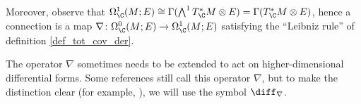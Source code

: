 Moreover, observe that \(\Omega_\C^1(M;E) \cong \Gamma(\bigwedge ^1T^*_\C M \otimes E)=\Gamma(T^*_\C M \otimes E)\), hence a connection is a map \(\nabla \colon \Omega_\C^0(M;E) \to \Omega_\C^1(M;E)\) satisfying the ``Leibniz rule'' of definition \ref{def_tot_cov_der}. 


The operator \(\nabla\) sometimes needs to be extended to act on higher-dimensional differential forms. Some references still call this operator \(\nabla\), but to make the distinction clear (for example, \parencite{kobayashi_complex_vector_bundles}), we will use the symbol \(\diff_\nabla\).

